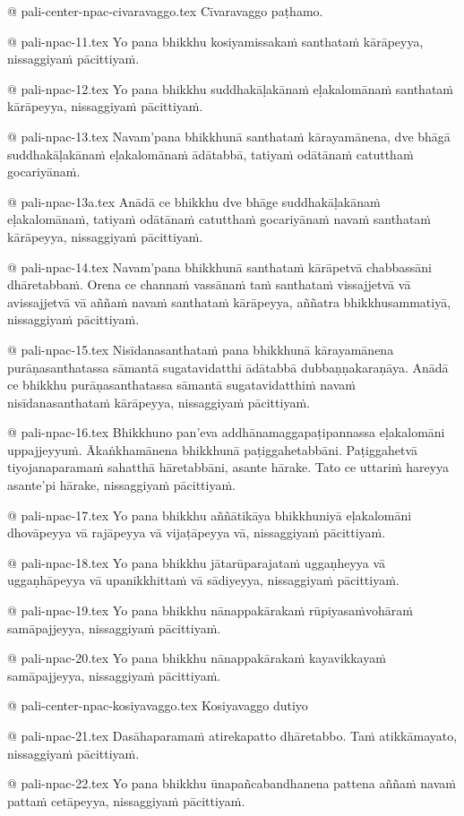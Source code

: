 @ pali-center-npac-civaravaggo.tex
Cīvaravaggo paṭhamo.

@ pali-npac-11.tex
Yo pana bhikkhu kosiyamissakaṁ santhataṁ kārāpeyya, nissaggiyaṁ pācittiyaṁ.

@ pali-npac-12.tex
Yo pana bhikkhu suddhakāḷakānaṁ eḷakalomānaṁ santhataṁ kārāpeyya, nissaggiyaṁ pācittiyaṁ.

@ pali-npac-13.tex
Navam’pana bhikkhunā santhataṁ kārayamānena, dve bhāgā suddhakāḷakānaṁ eḷakalomānaṁ ādātabbā, tatiyaṁ odātānaṁ catutthaṁ gocariyānaṁ.

@ pali-npac-13a.tex
Anādā ce bhikkhu dve bhāge suddhakāḷakānaṁ eḷakalomānaṁ, tatiyaṁ odātānaṁ catutthaṁ gocariyānaṁ navaṁ santhataṁ kārāpeyya, nissaggiyaṁ pācittiyaṁ.

@ pali-npac-14.tex
Navam’pana bhikkhunā santhataṁ kārāpetvā chabbassāni dhāretabbaṁ. Orena ce channaṁ vassānaṁ taṁ santhataṁ vissajjetvā vā avissajjetvā vā aññaṁ navaṁ santhataṁ kārāpeyya, aññatra bhikkhusammatiyā, nissaggiyaṁ pācittiyaṁ.

@ pali-npac-15.tex
Nisīdanasanthataṁ pana bhikkhunā kārayamānena purāṇasanthatassa sāmantā sugatavidatthi ādātabbā dubbaṇṇakaraṇāya. Anādā ce bhikkhu purāṇasanthatassa sāmantā sugatavidatthiṁ navaṁ nisīdanasanthataṁ kārāpeyya, nissaggiyaṁ pācittiyaṁ.

@ pali-npac-16.tex
Bhikkhuno pan’eva addhānamaggapaṭipannassa eḷakalomāni uppajjeyyuṁ. Ākaṅkhamānena bhikkhunā paṭiggahetabbāni. Paṭiggahetvā tiyojanaparamaṁ sahatthā hāretabbāni, asante hārake. Tato ce uttariṁ hareyya asante’pi hārake, nissaggiyaṁ pācittiyaṁ.

@ pali-npac-17.tex
Yo pana bhikkhu aññātikāya bhikkhuniyā eḷakalomāni dhovāpeyya vā rajāpeyya vā vijaṭāpeyya vā, nissaggiyaṁ pācittiyaṁ.

@ pali-npac-18.tex
Yo pana bhikkhu jātarūparajataṁ uggaṇheyya vā uggaṇhāpeyya vā upanikkhittaṁ vā sādiyeyya, nissaggiyaṁ pācittiyaṁ.

@ pali-npac-19.tex
Yo pana bhikkhu nānappakārakaṁ rūpiyasaṁvohāraṁ samāpajjeyya, nissaggiyaṁ pācittiyaṁ.

@ pali-npac-20.tex
Yo pana bhikkhu nānappakārakaṁ kayavikkayaṁ samāpajjeyya, nissaggiyaṁ pācittiyaṁ.

@ pali-center-npac-kosiyavaggo.tex
Kosiyavaggo dutiyo

@ pali-npac-21.tex
Dasāhaparamaṁ atirekapatto dhāretabbo. Taṁ atikkāmayato, nissaggiyaṁ pācittiyaṁ.

@ pali-npac-22.tex
Yo pana bhikkhu ūnapañcabandhanena pattena aññaṁ navaṁ pattaṁ cetāpeyya, nissaggiyaṁ pācittiyaṁ.

